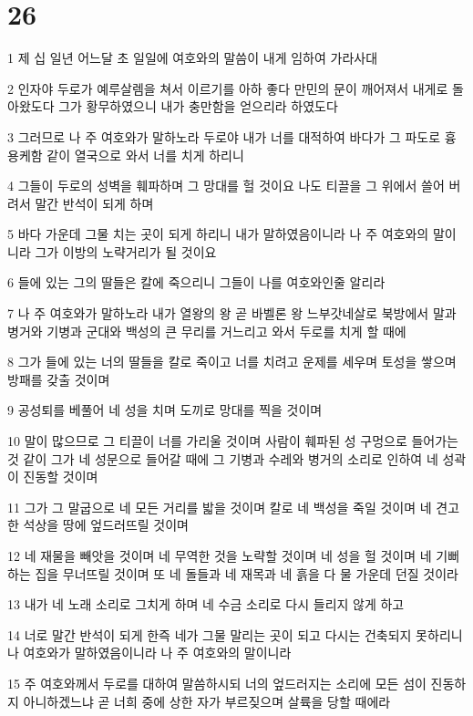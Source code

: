 \chapter{26}

\par 1 제 십 일년 어느달 초 일일에 여호와의 말씀이 내게 임하여 가라사대
\par 2 인자야 두로가 예루살렘을 쳐서 이르기를 아하 좋다 만민의 문이 깨어져서 내게로 돌아왔도다 그가 황무하였으니 내가 충만함을 얻으리라 하였도다
\par 3 그러므로 나 주 여호와가 말하노라 두로야 내가 너를 대적하여 바다가 그 파도로 흉용케함 같이 열국으로 와서 너를 치게 하리니
\par 4 그들이 두로의 성벽을 훼파하며 그 망대를 헐 것이요 나도 티끌을 그 위에서 쓸어 버려서 말간 반석이 되게 하며
\par 5 바다 가운데 그물 치는 곳이 되게 하리니 내가 말하였음이니라 나 주 여호와의 말이니라 그가 이방의 노략거리가 될 것이요
\par 6 들에 있는 그의 딸들은 칼에 죽으리니 그들이 나를 여호와인줄 알리라
\par 7 나 주 여호와가 말하노라 내가 열왕의 왕 곧 바벨론 왕 느부갓네살로 북방에서 말과 병거와 기병과 군대와 백성의 큰 무리를 거느리고 와서 두로를 치게 할 때에
\par 8 그가 들에 있는 너의 딸들을 칼로 죽이고 너를 치려고 운제를 세우며 토성을 쌓으며 방패를 갖출 것이며
\par 9 공성퇴를 베풀어 네 성을 치며 도끼로 망대를 찍을 것이며
\par 10 말이 많으므로 그 티끌이 너를 가리울 것이며 사람이 훼파된 성 구멍으로 들어가는 것 같이 그가 네 성문으로 들어갈 때에 그 기병과 수레와 병거의 소리로 인하여 네 성곽이 진동할 것이며
\par 11 그가 그 말굽으로 네 모든 거리를 밟을 것이며 칼로 네 백성을 죽일 것이며 네 견고한 석상을 땅에 엎드러뜨릴 것이며
\par 12 네 재물을 빼앗을 것이며 네 무역한 것을 노략할 것이며 네 성을 헐 것이며 네 기뻐하는 집을 무너뜨릴 것이며 또 네 돌들과 네 재목과 네 흙을 다 물 가운데 던질 것이라
\par 13 내가 네 노래 소리로 그치게 하며 네 수금 소리로 다시 들리지 않게 하고
\par 14 너로 말간 반석이 되게 한즉 네가 그물 말리는 곳이 되고 다시는 건축되지 못하리니 나 여호와가 말하였음이니라 나 주 여호와의 말이니라
\par 15 주 여호와께서 두로를 대하여 말씀하시되 너의 엎드러지는 소리에 모든 섬이 진동하지 아니하겠느냐 곧 너희 중에 상한 자가 부르짖으며 살륙을 당할 때에라
